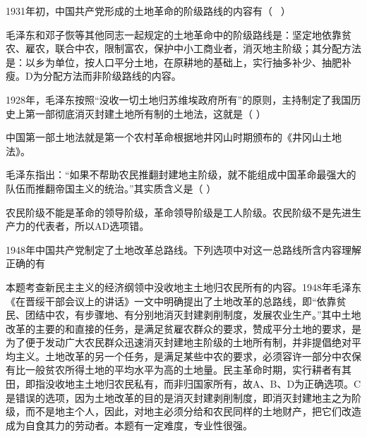 \question 1931年初，中国共产党形成的土地革命的阶级路线的内容有（ ~）
\par{}
\begin{solution}毛泽东和邓子恢等其他同志一起规定的土地革命中的阶级路线是：坚定地依靠贫农、雇农，联合中农，限制富农，保护中小工商业者，消灭地主阶级；其分配方法是：以乡为单位，按人口平分土地，在原耕地的基础上，实行抽多补少、抽肥补瘦。D为分配方法而非阶级路线的内容。
\end{solution}
\question 1928年，毛泽东按照``没收一切土地归苏维埃政府所有''的原则，主持制定了我国历史上第一部彻底消灭封建土地所有制的土地法，这就是（
）
\par{}
\begin{solution}中国第一部土地法就是第一个农村革命根据地井冈山时期颁布的《井冈山土地法》。
\end{solution}
\question 毛泽东指出：``如果不帮助农民推翻封建地主阶级，就不能组成中国革命最强大的队伍而推翻帝国主义的统治。''其实质含义是（
）
\par{}
\begin{solution}农民阶级不能是革命的领导阶级，革命领导阶级是工人阶级。农民阶级不是先进生产力的代表者，所以AD选项错。
\end{solution}
\question 1948年中国共产党制定了土地改革总路线。下列选项中对这一总路线所含内容理解正确的有
\par{}
\begin{solution}本题考查新民主主义的经济纲领中没收地主土地归农民所有的内容。1948年毛泽东《在晋绥干部会议上的讲话》一文中明确提出了土地改革的总路线，即``依靠贫民、团结中农，有步骤地、有分别地消灭封建剥削制度，发展农业生产。''其中土地改革的主要的和直接的任务，是满足贫雇农群众的要求，赞成平分土地的要求，是为了便于发动广大农民群众迅速消灭封建地主阶级的土地所有制，并非提倡绝对平均主义。土地改革的另一个任务，是满足某些中农的要求，必须容许一部分中农保有比一般贫农所得土地的平均水平为高的土地量。民主革命时期，实行耕者有其田，即指没收地主土地归农民私有，而非归国家所有，故A、B、D为正确选项。C是错误的选项，因为土地改革的目的是消灭封建剥削制度，即消灭封建地主之为阶级，而不是地主个人，因此，对地主必须分给和农民同样的土地财产，把它们改造成为自食其力的劳动者。本题有一定难度，专业性很强。
\end{solution}
